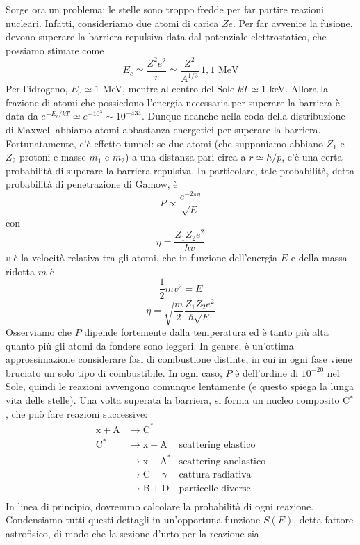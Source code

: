 \documentclass[a4paper,11pt]{article}
\theoremstyle{theorem}
\theoremstyle{definition}
\begin{document}
\begin{itemize}
		\noindent Sorge ora un problema: le stelle sono troppo fredde per far partire reazioni nucleari. Infatti, consideriamo due atomi di carica $Ze$. Per far avvenire la fusione, devono superare la barriera repulsiva data dal potenziale elettrostatico, che possiamo stimare come
		\[E_c\simeq\frac{Z^2e^2}{r}\simeq \frac{Z^2}{A^{1/3}}\,1,1\textrm{ MeV}\]
		Per l'idrogeno, $E_c\simeq 1$ MeV, mentre al centro del Sole $kT\simeq 1$ keV. Allora la frazione di atomi che possiedono l'energia necessaria per superare la barriera è data da $e^{-E_c/kT}\simeq e^{-10^3}\sim10^{-434}$. Dunque neanche nella coda della distribuzione di Maxwell abbiamo atomi abbastanza energetici per superare la barriera. Fortunatamente, c'è effetto tunnel: se due atomi (che supponiamo abbiano $Z_1$ e $Z_2$ protoni e masse $m_1$ e $m_2$) a una distanza pari circa a $r\simeq h/p$, c'è una certa probabilità di superare la barriera repulsiva. In particolare, tale probabilità, detta probabilità di penetrazione di Gamow, è
		\[P\propto\frac{e^{-2\pi\eta}}{\sqrt{E}}\]
		con
		\[\eta=\frac{Z_1Z_2e^2}{\hbar v}\]
		$v$ è la velocità relativa tra gli atomi, che in funzione dell'energia $E$ e della massa ridotta $m$ è
		\[\frac{1}{2}mv^2=E\]
		\[\eta=\sqrt{\frac{m}{2}}\frac{Z_1Z_2e^2}{\hbar\sqrt{E}}\]
		Osserviamo che $P$ dipende fortemente dalla temperatura ed è tanto più alta quanto più gli atomi da fondere sono leggeri. In genere, è un'ottima approssimazione considerare fasi di combustione distinte, in cui in ogni fase viene bruciato un solo tipo di combustibile. In ogni caso, $P$ è dell'ordine di $10^{-20}$ nel Sole, quindi le reazioni avvengono comunque lentamente (e questo spiega la lunga vita delle stelle). Una volta superata la barriera, si forma un nucleo composito C$^*$, che può fare reazioni successive:
		\begin{align*}
			\mathrm{x + A}&\rightarrow\mathrm{C}^*\\
			\mathrm{C}^*&\rightarrow\mathrm{x + A}&\textrm{scattering elastico}\\
			&\rightarrow\mathrm{x + A}^*&\textrm{scattering anelastico}\\
			&\rightarrow\mathrm{C + }\gamma&\textrm{cattura radiativa}\\
			&\rightarrow\mathrm{B + D}&\textrm{particelle diverse}\\
		\end{align*}
		In linea di principio, dovremmo calcolare la probabilità di ogni reazione. Condensiamo tutti questi dettagli in un'opportuna funzione $S(E)$, detta fattore astrofisico, di modo che la sezione d'urto per la reazione sia

\end{itemize}
\end{document}
